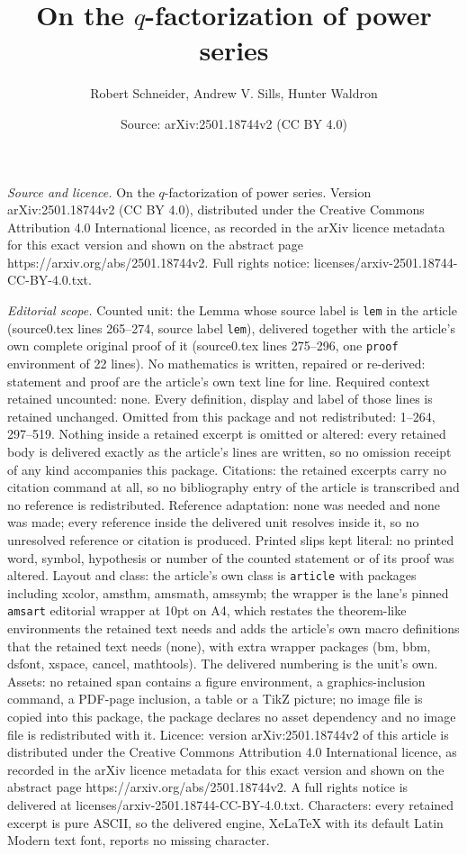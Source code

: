 \documentclass[10pt,a4paper]{amsart}
\title[On the $q$-factorization of power series]{On the $q$-factorization of power series}
\author{Robert Schneider, Andrew V. Sills, Hunter Waldron}
\date{Source: arXiv:2501.18744v2 (CC BY 4.0)}
\begin{document}
\maketitle

\noindent\emph{Source and licence.} On the $q$-factorization of power series. Version arXiv:2501.18744v2 (CC BY 4.0), distributed under the Creative Commons Attribution 4.0 International licence, as recorded in the arXiv licence metadata for this exact version and shown on the abstract page https://arxiv.org/abs/2501.18744v2. Full rights notice: licenses/arxiv-2501.18744-CC-BY-4.0.txt.\par\smallskip

\noindent\textit{Editorial scope.} Counted unit: the Lemma whose source label is \texttt{lem} in the article (source0.tex lines 265--274, source label \texttt{lem}), delivered together with the article's own complete original proof of it (source0.tex lines 275--296, one \texttt{proof} environment of 22 lines). No mathematics is written, repaired or re-derived: statement and proof are the article's own text line for line. Required context retained uncounted: none. Every definition, display and label of those lines is retained unchanged. Omitted from this package and not redistributed: 1--264, 297--519. Nothing inside a retained excerpt is omitted or altered: every retained body is delivered exactly as the article's lines are written, so no omission receipt of any kind accompanies this package. Citations: the retained excerpts carry no citation command at all, so no bibliography entry of the article is transcribed and no reference is redistributed. Reference adaptation: none was needed and none was made; every reference inside the delivered unit resolves inside it, so no unresolved reference or citation is produced. Printed slips kept literal: no printed word, symbol, hypothesis or number of the counted statement or of its proof was altered. Layout and class: the article's own class is \texttt{article} with packages including xcolor, amsthm, amsmath, amssymb; the wrapper is the lane's pinned \texttt{amsart} editorial wrapper at 10pt on A4, which restates the theorem-like environments the retained text needs and adds the article's own macro definitions that the retained text needs (none), with extra wrapper packages (bm, bbm, dsfont, xspace, cancel, mathtools). The delivered numbering is the unit's own. Assets: no retained span contains a figure environment, a graphics-inclusion command, a PDF-page inclusion, a table or a TikZ picture; no image file is copied into this package, the package declares no asset dependency and no image file is redistributed with it. Licence: version arXiv:2501.18744v2 of this article is distributed under the Creative Commons Attribution 4.0 International licence, as recorded in the arXiv licence metadata for this exact version and shown on the abstract page https://arxiv.org/abs/2501.18744v2. A full rights notice is delivered at licenses/arxiv-2501.18744-CC-BY-4.0.txt. Characters: every retained excerpt is pure ASCII, so the delivered engine, XeLaTeX with its default Latin Modern text font, reports no missing character.
\end{document}
